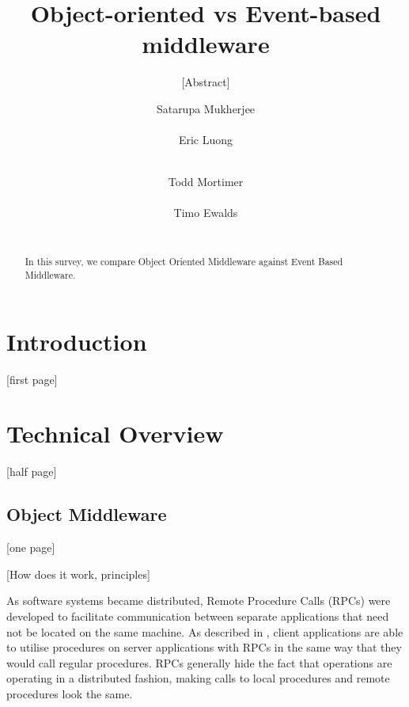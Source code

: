 \documentclass{acm_proc_article-sp}
\begin{document}
\title{Object-oriented vs Event-based middleware}
\subtitle{[Abstract]}


\author{
\alignauthor
Satarupa Mukherjee \\
       \\
\alignauthor
Eric Luong \\
       \\
\and  
\alignauthor 
Todd Mortimer \\
       \\
\alignauthor 
Timo Ewalds\\
      \\
}


\maketitle
\begin{abstract}

In this survey, we compare Object Oriented Middleware against Event Based Middleware.

\end{abstract}


\section{Introduction}

[first page]


\section{Technical Overview}

[half page]


\subsection{Object Middleware}

[one page]

[How does it work, principles]

As software systems became distributed, Remote Procedure Calls (RPCs) were developed to facilitate communication between separate applications that need not be located on the same machine.  As described in \cite{Vinoski:2004p8371}, client applications are able to utilise procedures on server applications with RPCs in the same way that they would call regular procedures.  RPCs generally hide the fact that operations are operating in a distributed fashion, making calls to local procedures and remote procedures look the same.
\end{document}
